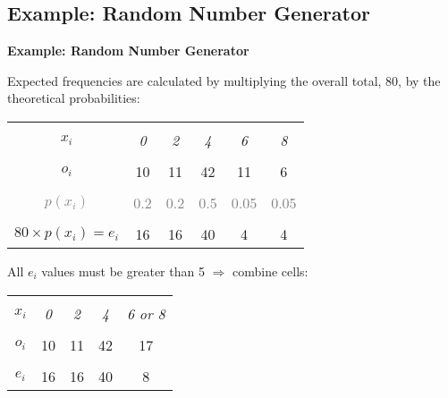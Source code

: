 \documentclass[compress]{beamer}        %
\makeatletter
\newcommand{\tcb}{\textcolor{beamer@blendedblue}}
\newcommand{\tcg}{\textcolor{gray}}
\makeatother
\begin{document}
\subsection{Example: Random Number Generator}
\begin{frame}{\bf \tcb{Example: Random Number Generator}}

Expected frequencies are calculated by multiplying the overall total, 80, by the theoretical probabilities:
\begin{center}
\begin{tabular}{|c|ccccc|}
\hline
&&&&&\\[-0.3cm]
$x_i$      & \emph{0} & \emph{2} & \emph{4} & \emph{6} & \emph{8} \\[0.1cm]
\hline
&&&&&\\[-0.3cm]
$o_i$ & 10 & 11 & 42 &  11 &  6 \\[0.1cm]
\hline
&&&&&\\[-0.3cm]
\tcg{$p(x_i)$} & \tcg{0.2} & \tcg{0.2} & \tcg{0.5} & \tcg{0.05} & \tcg{0.05} \\[0.1cm]
\hline
&&&&&\\[-0.3cm]
$80\times p(x_i) = e_i$ & 16 & 16 & 40 & 4 & 4 \\[0.1cm]
\hline
\end{tabular}
\end{center}

All $e_i$ values must be greater than 5 $\Rightarrow$ combine cells:
\begin{center}
\begin{tabular}{|c|cccc|}
\hline
&&&&\\[-0.3cm]
$x_i$      & \emph{0} & \emph{2} & \emph{4} & \emph{6 or 8} \\[0.1cm]
\hline
&&&&\\[-0.3cm]
$o_i$ & 10 & 11 & 42 &  17 \\[0.1cm]
\hline
&&&&\\[-0.3cm]
$e_i$ & 16 & 16 & 40 & 8 \\[0.1cm]
\hline
\end{tabular}
\end{center}

\end{frame}
\end{document}
